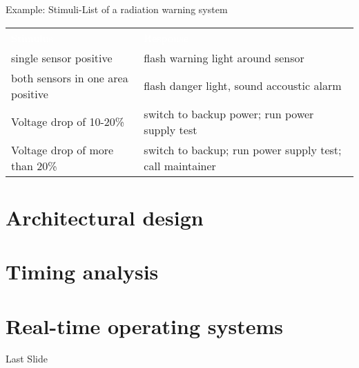\documentclass[ngerman={babel}, utf8, bigger, xcolor={table,dvipsnames}, ompress, hyperref={bookmarks,colorlinks}]{beamer}
\begin{document}
\begin{frame}{Example: Stimuli-List of a radiation warning system}
	\begin{tabular}{p{9em}p{13em}}
		\rowcolor{blue}\hline \textcolor{white}{Stimulus} & \textcolor{white}{Response} \\
		\pause single sensor positive & \pause flash warning light around sensor \\
		\pause both sensors in one area positive & \pause flash danger light, sound accoustic alarm \\
		\pause Voltage drop of 10-20\% & \pause switch to backup power; run power supply test \\
		\pause Voltage drop of more than 20\% & \pause switch to backup; run power supply test; call maintainer \\
	\end{tabular} \pause
\end{frame}

\section{Architectural design}

\section{Timing analysis}

\section{Real-time operating systems}


\begin{frame}{Last Slide}
	\vspace*{4em}{\huge Last Slide}
\end{frame}

\end{document}
